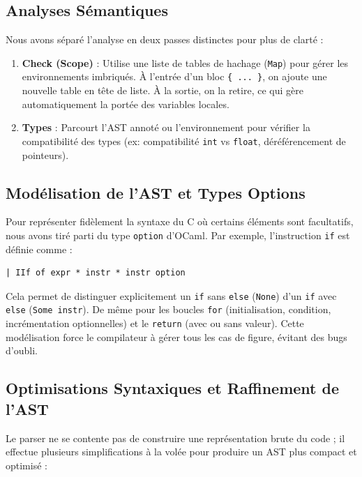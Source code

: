 \documentclass[a4paper,11pt]{article}
\begin{document}
\subsection{Analyses Sémantiques}
Nous avons séparé l'analyse en deux passes distinctes pour plus de clarté :
\begin{enumerate}
    \item \textbf{Check (Scope)} : Utilise une liste de tables de hachage (\texttt{Map}) pour gérer les environnements imbriqués. À l'entrée d'un bloc \texttt{\{ ... \}}, on ajoute une nouvelle table en tête de liste. À la sortie, on la retire, ce qui gère automatiquement la portée des variables locales.
    \item \textbf{Types} : Parcourt l'AST annoté ou l'environnement pour vérifier la compatibilité des types (ex: compatibilité \texttt{int} vs \texttt{float}, déréférencement de pointeurs).
\end{enumerate}

\subsection{Modélisation de l'AST et Types Options}
Pour représenter fidèlement la syntaxe du C où certains éléments sont facultatifs, nous avons tiré parti du type \texttt{option} d'OCaml.
Par exemple, l'instruction \texttt{if} est définie comme :
\begin{verbatim}
| IIf of expr * instr * instr option
\end{verbatim}
Cela permet de distinguer explicitement un \texttt{if} sans \texttt{else} (\texttt{None}) d'un \texttt{if} avec \texttt{else} (\texttt{Some instr}). De même pour les boucles \texttt{for} (initialisation, condition, incrémentation optionnelles) et le \texttt{return} (avec ou sans valeur). Cette modélisation force le compilateur à gérer tous les cas de figure, évitant des bugs d'oubli.

\subsection{Optimisations Syntaxiques et Raffinement de l'AST}
Le parser ne se contente pas de construire une représentation brute du code ; il effectue plusieurs simplifications à la volée pour produire un AST plus compact et optimisé :
\end{document}
